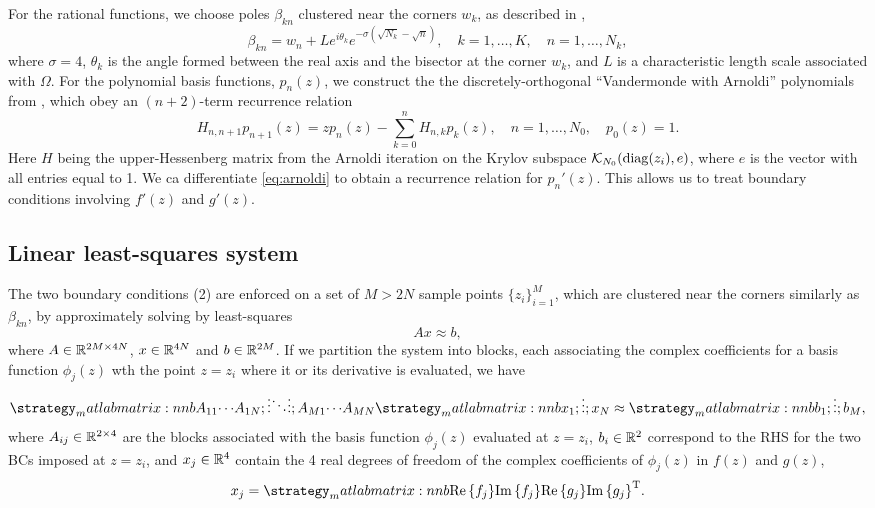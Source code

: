 For the rational functions, we choose poles $\beta_{kn}$ clustered near the corners $w_k$, as described in \cite{gopal19},
\begin{equation}
\beta_{kn} = w_n + Le^{i\theta_k} e^{-\sigma (\sqrt{N_k}-\sqrt{n})}, \quad k=1,\ldots,K,\quad n=1,\ldots,N_k,
\end{equation}
where $\sigma=4$, $\theta_k$ is the angle formed between the real axis and the bisector at the corner $w_k$, and $L$ is a characteristic length scale associated with $\Omega$. For the polynomial basis functions, $p_n(z)$, we construct the  the discretely-orthogonal ``Vandermonde with Arnoldi'' polynomials from \cite{brubeck19}, which obey an $(n+2)$-term recurrence relation
\begin{equation} \label{eq:arnoldi}
H_{n,n+1} p_{n+1}(z) = z p_n(z) - \sum_{k=0}^n H_{n,k} p_k(z),\quad n=1,\ldots,N_0, \quad p_0(z)=1.
\end{equation}
Here $H$ being the upper-Hessenberg matrix from the Arnoldi iteration on the Krylov subspace $\mathcal{K}_{N_0}(\operatorname{diag}(z_i), e)$, where $e$ is the vector with all entries equal to 1. We ca differentiate \eqref{eq:arnoldi} to obtain a recurrence relation for $p_n'(z)$. This allows us to treat boundary conditions involving $f'(z)$ and $g'(z)$.



\subsection{Linear least-squares system}
The two boundary conditions (2) are enforced on a set of $M > 2N$ sample points $\{z_i \}_{i=1}^M$, which
are clustered near the corners similarly as $\beta_{kn}$, by approximately solving by least-squares
\begin{equation} \label{eq:LS}
A x\approx b,
\end{equation}
where $A\in\mathbb{R}^{2M\times 4N}$, $x\in\mathbb{R}^{4N}$ and $b\in\mathbb{R}^{2M}$. If we partition the system into blocks, each associating the complex coefficients for a basis function $\phi_j(z)$ wth the point $z=z_i$ where it or its derivative is evaluated, we have
\begin{equation}
\matlabmatrix{A_{11} {\cdots} A_{1N}; {\vdots} {\ddots} {\vdots}; A_{M1} {\cdots} A_{MN}}
\matlabmatrix{x_{1}; {\vdots}; x_{N}} \approx \matlabmatrix{b_{1}; {\vdots}; b_{M}},
\end{equation}
where $A_{ij}\in\mathbb{R}^{2\times 4}$ are the blocks associated with the basis function $\phi_{j}(z)$ evaluated at $z=z_i$, $b_i\in\mathbb{R}^2$ correspond to the RHS for the two BCs imposed at $z=z_i$, and $x_j\in\mathbb{R}^4$ contain the 4 real degrees of freedom of the complex coefficients of $\phi_j(z)$ in $f(z)$ and $g(z)$,
\begin{equation}
x_ j = \matlabmatrix{\real{f_j} \imag{f_j} \real{g_j} \imag{g_j}}^\transp.
\end{equation}


